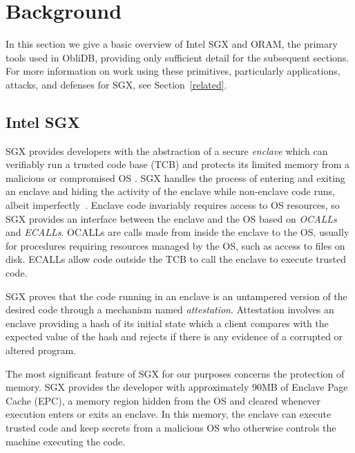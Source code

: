 \documentclass[letterpaper,twocolumn,10pt]{article}
\def\name/{ObliDB}
\begin{document}
\section{Background}\label{background}
In this section we give a basic overview of Intel SGX and ORAM, the primary tools used in \name/, providing only sufficient detail for the subsequent sections. For more information on work using these primitives, particularly applications, attacks, and defenses for SGX, see Section~\ref{related}.

\subsection{Intel SGX}

SGX provides developers with the abstraction of a secure \textit{enclave} which can verifiably run a trusted code base (TCB) and protects its limited memory from a malicious or compromised OS \cite{CD16, SGXRef}. SGX handles the process of entering and exiting an enclave and hiding the activity of the enclave while non-enclave code runs, albeit imperfectly~\cite{LSG+16}. Enclave code invariably requires access to OS resources, so SGX provides an interface between the enclave and the OS based on \textit{OCALLs} and \textit{ECALLs}. OCALLs are calls made from inside the enclave to the OS, usually for procedures requiring resources managed by the OS, such as access to files on disk. ECALLs allow code outside the TCB to call the enclave to execute trusted code. 

SGX proves that the code running in an enclave is an untampered version of the desired code through a mechanism named \textit{attestation}. Attestation involves an enclave providing a hash of its initial state which a client compares with the expected value of the hash and rejects if there is any evidence of a corrupted or altered program. 

The most significant feature of SGX for our purposes concerns the protection of memory. SGX provides the developer with approximately 90MB of Enclave Page Cache (EPC), a memory region hidden from the OS and cleared whenever execution enters or exits an enclave. In this memory, the enclave can execute trusted code and keep secrets from a malicious OS who otherwise controls the machine executing the code. 
\end{document}
